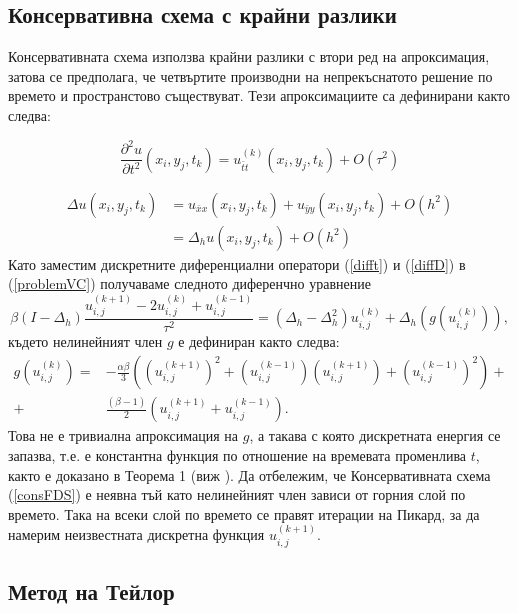 \documentclass{article}
\newcommand{\be}{\begin{equation}}
\newcommand{\ee}{\end{equation}}
\newcommand{\rf}[1]{(\ref{#1})}
\begin{document}
\subsection{ Консервативна схема с крайни разлики }

Консервативната схема използва крайни разлики с втори ред на апроксимация, затова се предполага, че четвъртите производни на непрекъснатото решение по времето и пространстово съществуват.  Тези апроксимациите са дефинирани както следва:

\be\label{difft}
\frac{\partial^2 u}{\partial t^2}(x_i, y_j, t_k ) = u^{(k)}_{\bar{t}t}(x_i, y_j, t_k ) + O(\tau^2) 
\ee

\begin{align}\label{diffD}
\Delta u(x_i, y_j, t_k )  &= u_{\bar{x}x}(x_i, y_j, t_k ) +  u_{\bar{y}y}(x_i, y_j, t_k ) +  O(h^2)  \nonumber\\
			      &= \Delta_h u(x_i, y_j, t_k ) +  O(h^2) 
\end{align}
Като заместим дискретните диференциални оператори \rf{difft} и \rf{diffD} в \rf{problemVC} получаваме следното диференчно уравнение
\be\label{consFDS}
\beta (I-\Delta_h)\frac{ u^{(k+1)}_{i, j} - 2u^{(k)}_{i,j} + u^{(k-1)}_{i,j} }{\tau^2} = (\Delta_h - \Delta_h^2)u^{(k)}_{i,j} + \Delta_h(g(u^{(k)}_{i,j})),
\ee
%
където нелинейният член $g$ е дефиниран както следва:
\begin{align}
g(u^{(k)}_{i,j})=& -\frac{\alpha \beta} { 3 } \left( (u^{(k+1)}_{i,j})^2 + (u^{(k-1)}_{i,j})(u^{(k+1)}_{i,j}) + (u^{(k-1)}_{i,j})^2 \right) + \nonumber\\
+&\frac{ (\beta - 1 )}{ 2 }\left( u^{(k+1)}_{i,j} + u^{(k-1)}_{i,j} \right).
\end{align}
Това не е тривиална апроксимация на $g$, а такава с която дискретната енергия се запазва, т.е. е константна функция по отношение на времевата променлива $t$, както е доказано в Теорема 1 (виж \cite{ref20}). Да отбележим, че Консервативната схема \rf{consFDS} е неявна тъй като нелинейният член зависи от горния слой по времето. Така на всеки слой по времето се правят итерации на Пикард, за да намерим неизвестната дискретна функция $u^{(k+1)}_{i,j}$.

\subsection{ Метод на Тейлор }
\end{document}

